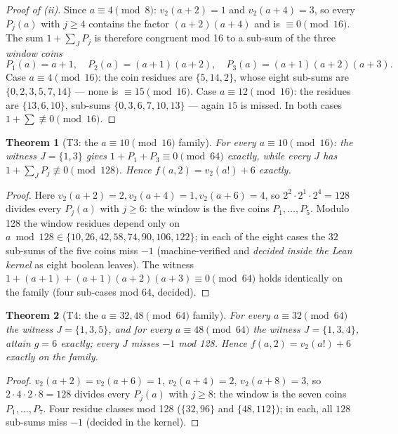 \documentclass[11pt]{article}
\newtheorem{theorem}{Theorem}
\newcommand{\vtwo}{v_2}
\begin{document}
\begin{proof}[Proof of (ii)]
Since $a \equiv 4 \pmod 8$: $\vtwo(a+2) = 1$ and $\vtwo(a+4) = 3$, so every
$P_j(a)$ with $j \ge 4$ contains the factor $(a+2)(a+4)$ and is
$\equiv 0 \pmod{16}$. The sum $1 + \sum_J P_j$ is therefore congruent mod 16
to a sub-sum of the three \emph{window coins}
\[
P_1(a) = a+1,\quad P_2(a) = (a+1)(a+2),\quad P_3(a) = (a+1)(a+2)(a+3).
\]
Case $a \equiv 4 \pmod{16}$: the coin residues are
$\{5, 14, 2\}$, whose eight sub-sums are
$\{0, 2, 3, 5, 7, 14\}$ --- none is $\equiv 15 \pmod{16}$.
Case $a \equiv 12 \pmod{16}$: the residues are $\{13, 6, 10\}$, sub-sums
$\{0, 3, 6, 7, 10, 13\}$ --- again $15$ is missed.
In both cases $1 + \sum \not\equiv 0 \pmod{16}$.
\end{proof}

\begin{theorem}[T3: the $a \equiv 10 \pmod{16}$ family]
For every $a \equiv 10 \pmod{16}$: the witness $J = \{1,3\}$ gives
$1 + P_1 + P_3 \equiv 0 \pmod{64}$ exactly, while every $J$ has
$1 + \sum_J P_j \not\equiv 0 \pmod{128}$. Hence
$f(a,2) = \vtwo(a!) + 6$ exactly.
\end{theorem}

\begin{proof}
Here $\vtwo(a+2)=2, \vtwo(a+4)=1, \vtwo(a+6)=4$, so $2^2 \cdot 2^1 \cdot 2^4
= 128$ divides every $P_j(a)$ with $j \ge 6$: the window is the five coins
$P_1,\dots,P_5$. Modulo 128 the window residues depend only on
$a \bmod 128 \in \{10, 26, 42, 58, 74, 90, 106, 122\}$; in each of the eight
cases the $32$ sub-sums of the five coins miss $-1$ (machine-verified and
\emph{decided inside the Lean kernel} as eight boolean leaves). The witness
$1 + (a+1) + (a+1)(a+2)(a+3) \equiv 0 \pmod{64}$ holds identically on the
family (four sub-cases mod 64, decided).
\end{proof}

\begin{theorem}[T4: the $a \equiv 32, 48 \pmod{64}$ family]
For every $a \equiv 32 \pmod{64}$ the witness $J = \{1,3,5\}$, and for every
$a \equiv 48 \pmod{64}$ the witness $J = \{1,3,4\}$, attain
$g = 6$ exactly; every $J$ misses $-1$ mod 128. Hence
$f(a,2) = \vtwo(a!) + 6$ exactly on the family.
\end{theorem}

\begin{proof}
$\vtwo(a+2) = \vtwo(a+6) = 1$, $\vtwo(a+4) = 2$, $\vtwo(a+8) = 3$, so
$2\cdot 4 \cdot 2 \cdot 8 = 128$ divides every $P_j(a)$ with $j \ge 8$:
the window is the seven coins $P_1, \dots, P_7$. Four residue classes
mod 128 ($\{32, 96\}$ and $\{48, 112\}$); in each, all $128$ sub-sums miss
$-1$ (decided in the kernel).
\end{proof}
\end{document}
